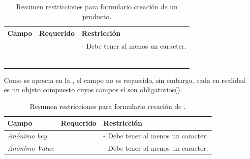 		\begin{table}[H]
		    \centering
			\begin{tabular}{ |l|c||l| }
				\hline Campo & Requerido & Restricción \\ \hline
				\multirow{1}{*}{\titleForm} 			&  \multirow{1}{*}{\checkmark} & - Debe tener al menos un caracter. \\ \hline
				\multirow{1}{*}{\pageTitleForm} 	&  \multirow{1}{*}{} &  \\ \hline
				\multirow{1}{*}{\vendorForm}		&  \multirow{1}{*}{} &  \\ \hline
				\multirow{1}{*}{\optionsForm}		&  \multirow{1}{*}{\checkmark} &  \\ \hline
				\multirow{1}{*}{\descriptionForm}	&  \multirow{1}{*}{} &  \\ \hline
				\multirow{1}{*}{\multimediaForm}	&  \multirow{1}{*}{} &  \\ \hline
				\multirow{1}{*}{\tagsForm}			&  \multirow{1}{*}{} &  \\ \hline
			\end{tabular}
		 	\caption{Resumen restricciones para formulario creación de un producto.}
		    \label{tab:solution:products:create:form:product:generic}
		\end{table}

		Como se aprecia en la , el campo \detailsForm no es requerido, sin embargo, cada \detailForm en realidad es un objeto compuesto cuyos campos sí son obligatorios().

		\begin{table}[H]
		    \centering
			\begin{tabular}{ |l|c||l| }
				\hline Campo & Requerido & Restricción \\ \hline
				\multirow{1}{*}{\textit{Anónimo key}}	&  \multirow{1}{*}{\checkmark} & - Debe tener al menos un caracter. \\ \hline
				\multirow{1}{*}{\textit{Anónimo Value}}	&  \multirow{1}{*}{\checkmark} & - Debe tener al menos un caracter. \\ \hline
			\end{tabular}
		 	\caption{Resumen restricciones para formulario creación de \detailsForm.}
		    \label{tab:solution:products:create:form:product:generic:details}
		\end{table}

